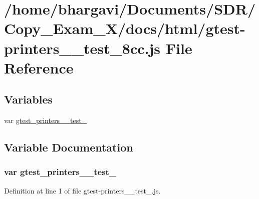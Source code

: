 \hypertarget{gtest-printers____test__8cc_8js}{}\section{/home/bhargavi/\+Documents/\+S\+D\+R/\+Copy\+\_\+\+Exam\+\_\+X/docs/html/gtest-\/printers\+\_\+\+\_\+test\+\_\+8cc.js File Reference}
\label{gtest-printers____test__8cc_8js}
\subsection*{Variables}
\begin{DoxyCompactItemize}
\item 
var \hyperlink{gtest-printers____test__8cc_8js_a66adfa3b2864e68ea9ee741f63aa03bc}{gtest\+\_\+printers\+\_\+\+\_\+test\+\_}
\end{DoxyCompactItemize}


\subsection{Variable Documentation}
\subsubsection[{\texorpdfstring{gtest\+\_\+printers\+\_\+\+\_\+test\+\_\+8cc}{gtest_printers__test_8cc}}]{\setlength{\rightskip}{0pt plus 5cm}var gtest\+\_\+printers\+\_\+\+\_\+test\+\_}\hypertarget{gtest-printers____test__8cc_8js_a66adfa3b2864e68ea9ee741f63aa03bc}{}\label{gtest-printers____test__8cc_8js_a66adfa3b2864e68ea9ee741f63aa03bc}


Definition at line 1 of file gtest-\/printers\+\_\+\+\_\+test\+\_.\+js.

